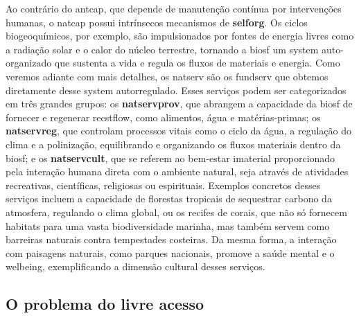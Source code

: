 \documentclass[./main.tex]{subfiles}
\begin{document}
\par Ao contrário do \gls{antcap}, que depende de manutenção contínua por intervenções humanas, o \gls{natcap} possui intrínsecos mecanismos de \textbf{\gls{selforg}}. Os ciclos biogeoquímicos, por exemplo, são impulsionados por fontes de energia livres como a radiação solar e o calor do núcleo terrestre, tornando a \gls{biosf} um \gls{system} auto-organizado que sustenta a vida e regula os fluxos de materiais e energia. Como veremos adiante com mais detalhes, os \gls{natserv} são os \gls{fundserv} que obtemos diretamente desse \gls{system} autorregulado. Esses serviços podem ser categorizados em três grandes grupos: os \textbf{\gls{natservprov}}, que abrangem a capacidade da \gls{biosf} de fornecer e regenerar \gls{recstflow}, como alimentos, água e matérias-primas; os \textbf{\gls{natservreg}}, que controlam processos vitais como o ciclo da água, a regulação do clima e a polinização, equilibrando e organizando os fluxos materiais dentro da \gls{biosf}; e os \textbf{\gls{natservcult}}, que se referem ao bem-estar imaterial proporcionado pela interação humana direta com o ambiente natural, seja através de atividades recreativas, científicas, religiosas ou espirituais. Exemplos concretos desses serviços incluem a capacidade de florestas tropicais de sequestrar carbono da atmosfera, regulando o clima global, ou os recifes de corais, que não só fornecem habitats para uma vasta biodiversidade marinha, mas também servem como barreiras naturais contra tempestades costeiras. Da mesma forma, a interação com paisagens naturais, como parques nacionais, promove a saúde mental e o \gls{welbeing}, exemplificando a dimensão cultural desses serviços.

\subsection{O problema do livre acesso} \label{subsec:tragedy}
\end{document}
